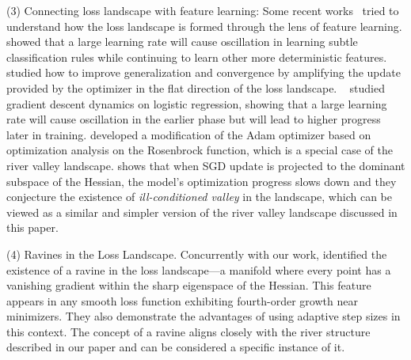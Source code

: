 (3) Connecting loss landscape with feature learning: Some recent works~\citep{nakkiran2019sgd, rosenfeld2023outliers} tried to understand how the loss landscape is formed through the lens of feature learning. \citet{rosenfeld2023outliers} showed that a large learning rate will cause oscillation in learning subtle classification rules while continuing to learn other more deterministic features.~\citet{wang2024improvinggeneralizationconvergenceenhancing} studied how to improve generalization and convergence by amplifying the update provided by the optimizer in the flat direction of the loss landscape. ~\citet{wu2024largestepsizegradientdescent, cai2024largestepsizegradientdescent} studied gradient descent dynamics on logistic regression, showing that a large learning rate will cause oscillation in the earlier phase but will lead to higher progress later in training. \citet{pagliardini2024ademamixoptimizerbetterfaster} developed a modification of the Adam optimizer based on optimization analysis on the Rosenbrock function, which is a special case of the river valley landscape. \citet{song2024doessgdreallyhappen} shows that when SGD update is projected to the dominant subspace of the Hessian, the model's optimization progress slows down and they conjecture the existence of \emph{ill-conditioned valley} in the landscape, which can be viewed as a similar and simpler version of the river valley landscape discussed in this paper. 

(4) Ravines in the Loss Landscape. Concurrently with our work, \citet{davis2024gradientdescentadaptivestepsize} identified the existence of a ravine in the loss landscape—a manifold where every point has a vanishing gradient within the sharp eigenspace of the Hessian. This feature appears in any smooth loss function exhibiting fourth-order growth near minimizers. They also demonstrate the advantages of using adaptive step sizes in this context. The concept of a ravine aligns closely with the river structure described in our paper and can be considered a specific instance of it.

